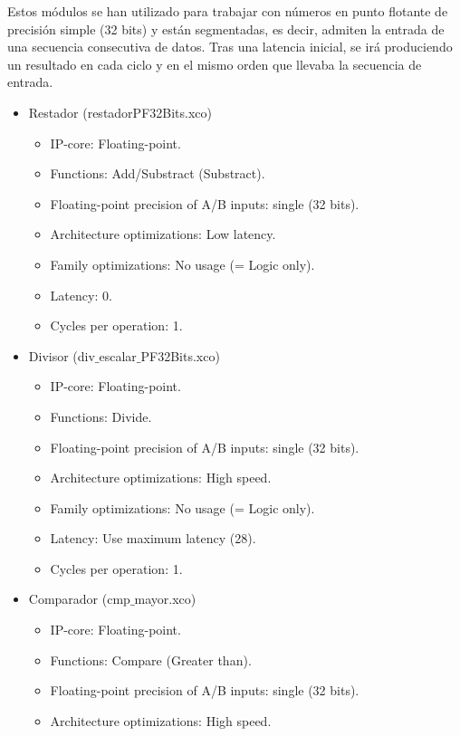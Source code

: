 Estos módulos se han utilizado para trabajar con números en punto flotante de precisión simple (32 bits) y están segmentadas, es decir, admiten la entrada de una secuencia consecutiva de datos. Tras una latencia inicial, se irá produciendo un resultado en cada ciclo y en el mismo orden que llevaba la secuencia de entrada.

\begin{itemize}
    \item Restador (restadorPF32Bits.xco)
        \begin{itemize}
            \item IP-core: Floating-point.
            \item Functions: Add/Substract (Substract).
            \item Floating-point precision of A/B inputs: single (32 bits).
            \item Architecture optimizations: Low latency.
            \item Family optimizations: No usage (= Logic only).
            \item Latency: 0.
            \item Cycles per operation: 1.
        \end{itemize}
    \item Divisor (div$\_$escalar$\_$PF32Bits.xco)
        \begin{itemize}
            \item IP-core: Floating-point.
            \item Functions: Divide.
            \item Floating-point precision of A/B inputs: single (32 bits).
            \item Architecture optimizations: High speed.
            \item Family optimizations: No usage (= Logic only).
            \item Latency: Use maximum latency (28).
            \item Cycles per operation: 1.
        \end{itemize}
    \item Comparador (cmp$\_$mayor.xco)
        \begin{itemize}
            \item IP-core: Floating-point.
            \item Functions: Compare (Greater than).
            \item Floating-point precision of A/B inputs: single (32 bits).
            \item Architecture optimizations: High speed.

\end{itemize}
\end{itemize}

